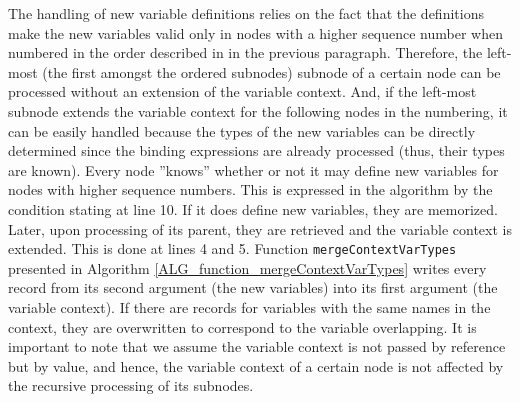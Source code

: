 The handling of new variable definitions relies on the fact that the definitions make the new variables valid only in nodes with a higher sequence number when numbered in the order described in in the previous paragraph. Therefore, the left-most (the first amongst the ordered subnodes) subnode of a certain node can be processed without an extension of the variable context. And, if the left-most subnode extends the variable context for the following nodes in the numbering, it can be easily handled because the types of the new variables can be directly determined since the binding expressions are already processed (thus, their types are known). Every node ''knows'' whether or not it may define new variables for nodes with higher sequence numbers. This is expressed in the algorithm by the condition stating at line 10. If it does define new variables, they are memorized. Later, upon processing of its parent, they are retrieved and the variable context is extended. This is done at lines 4 and 5. Function \texttt{mergeContextVarTypes} presented in Algorithm \ref{ALG_function_mergeContextVarTypes} writes every record from its second argument (the new variables) into its first argument (the variable context). If there are records for variables with the same names in the context, they are overwritten to correspond to the variable overlapping. It is important to note that we assume the variable context is not passed by reference but by value, and hence, the variable context of a certain node is not affected by the recursive processing of its subnodes.

